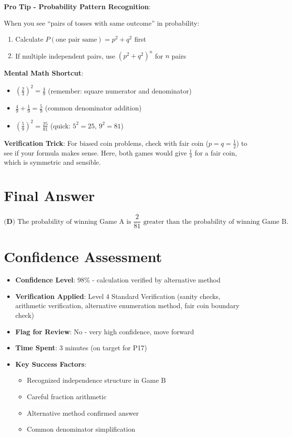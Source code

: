 \documentclass[]{article}
\begin{document}
\begin{tipbox}
\textbf{Pro Tip - Probability Pattern Recognition}: 

When you see ``pairs of tosses with same outcome'' in probability:
\begin{enumerate}
    \item Calculate $P(\text{one pair same}) = p^2 + q^2$ first
    \item If multiple independent pairs, use $(p^2 + q^2)^n$ for $n$ pairs
\end{enumerate}

\textbf{Mental Math Shortcut}:
\begin{itemize}
    \item $\left(\frac{2}{3}\right)^2 = \frac{4}{9}$ (remember: square numerator and denominator)
    \item $\frac{4}{9} + \frac{1}{9} = \frac{5}{9}$ (common denominator addition)
    \item $\left(\frac{5}{9}\right)^2 = \frac{25}{81}$ (quick: $5^2 = 25$, $9^2 = 81$)
\end{itemize}

\textbf{Verification Trick}: For biased coin problems, check with fair coin ($p = q = \frac{1}{2}$) to see if your formula makes sense. Here, both games would give $\frac{1}{4}$ for a fair coin, which is symmetric and sensible.
\end{tipbox}

\section*{Final Answer}
\[\boxed{\textbf{(D)} \text{ The probability of winning Game A is } \frac{2}{81} \text{ greater than the probability of winning Game B.}}\]

\section*{Confidence Assessment}
\begin{itemize}[leftmargin=*]
    \item \textbf{Confidence Level}: 98\% - calculation verified by alternative method
    \item \textbf{Verification Applied}: Level 4 Standard Verification (sanity checks, arithmetic verification, alternative enumeration method, fair coin boundary check)
    \item \textbf{Flag for Review}: No - very high confidence, move forward
    \item \textbf{Time Spent}: 3 minutes (on target for P17)
    \item \textbf{Key Success Factors}: 
    \begin{itemize}
        \item Recognized independence structure in Game B
        \item Careful fraction arithmetic
        \item Alternative method confirmed answer
        \item Common denominator simplification
    \end{itemize}
\end{itemize}
\end{document}

